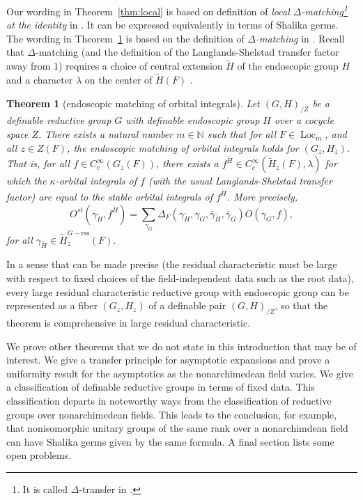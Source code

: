 \documentclass[12pt]{amsart}
\newcommand{\op}[1]{\operatorname{#1}}
\newcommand{\ring}[1]{{\mathbb #1}}
\newcommand{\reg}{\mathrm{rss}}
\theoremstyle{plain}
\newtheorem{theorem}[thm]{Theorem}
\theoremstyle{definition}
\begin{document}
Our wording in Theorem~\ref{thm:local} is based on definition of {\it
  local $\Delta$-matching\footnote{It is called $\Delta$-transfer in
    \cite{LSd}.} at the identity} in \cite{LSd}.  It can be
expressed equivalently in terms of Shalika germs.  The wording in
Theorem~\ref{thm:xfer} is based on the definition of {\it
  $\Delta$-matching} in \cite{LSd}.  Recall that $\Delta$-matching
(and the definition of the Langlands-Shelstad transfer factor away
from $1$) requires a choice of central extension $\tilde H$ of the
endoscopic group $H$ and a character $\lambda$ on the center of
$\tilde H(F)$ \cite[Sec.4.4]{LSxf}.

\begin{theorem}[endoscopic matching of orbital integrals]\label{thm:xfer}
  Let $(G,H)_{/Z}$ be a definable reductive group $G$ with definable
  endoscopic group $H$ over a cocycle space $Z$.  There exists a
  natural number $m\in \ring{N}$ such that for all $F\in
  \op{Loc}_{m}$, and all $z\in Z(F)$, the endoscopic matching of
  orbital integrals holds for $(G_z,H_z)$.  That is, for all $f\in
  C_c^\infty(G_z(F))$, there exists a $f^{\tilde H}\in
  C_c^\infty(\tilde H_z(F),\lambda)$ for which the $\kappa$-orbital
  integrals of $f$ (with the usual Langlands-Shelstad transfer factor)
  are equal to the stable orbital integrals of $f^{\tilde H}$. More
  precisely,
\[
O^{st}(\gamma_{\tilde H},f^{\tilde H}) = \sum_{\gamma_G}
\Delta_F(\gamma_{\tilde H},\gamma_G,\bar
\gamma_{\tilde H},\bar \gamma_G) O(\gamma_G,f),
\]
for all $\gamma_{\tilde H}\in {\tilde H}^{G-\reg}_z(F)$.
\end{theorem}

In a sense that can be made precise (the residual characteristic must
be large with respect to fixed choices of the field-independent data
such as the root data), every large residual characteristic reductive
group with endoscopic group can be represented as a fiber $(G_z,H_z)$
of a definable pair $(G,H)_{/Z}$, so that the theorem is comprehensive in
large residual characteristic.

We prove other theorems that we do not state in this introduction that
may be of interest.  We give a transfer principle for asymptotic
expansions and prove a uniformity result for the asymptotics as the
nonarchimedean field varies.  We give a classification of definable
reductive groups in terms of fixed data.  This classification departs in
noteworthy ways from the classification of reductive groups
over nonarchimedean fields.  This leads to the conclusion, for
example, that nonisomorphic unitary groups of the same rank over a
nonarchimdean field can have Shalika germs given by the same formula.
A final section lists some open problems.
\end{document}
